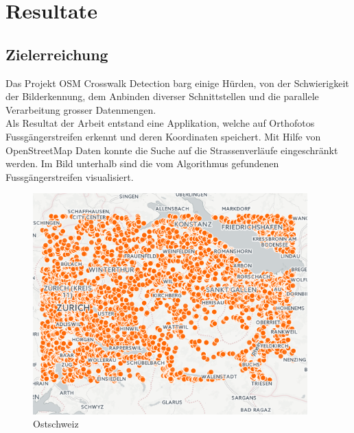 \newpage
\section{Resultate}
\subsection{Zielerreichung}
Das Projekt OSM Crosswalk Detection barg einige Hürden, von der Schwierigkeit der Bilderkennung, dem Anbinden diverser Schnittstellen und die parallele Verarbeitung grosser Datenmengen.\\
Als Resultat der Arbeit entstand eine Applikation, welche auf Orthofotos Fussgängerstreifen erkennt und deren Koordinaten speichert. Mit Hilfe von OpenStreetMap Daten konnte die Suche auf die Strassenverläufe eingeschränkt werden.
Im Bild unterhalb sind die vom Algorithmus gefundenen Fussgängerstreifen visualisiert. \\
\begin{figure}[H]
\centering
\includegraphics[width=300pt]{images/ostschweiz.png}
\caption[Ostschweiz]{Ostschweiz}
\end{figure}